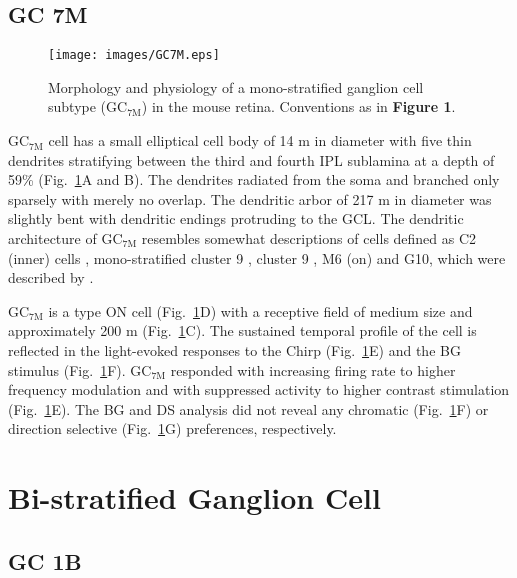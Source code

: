 \subsection{GC 7M}     

\begin{figure}[t]
\begin{center}
\texttt{[image: images/GC7M.eps]}
\caption{Morphology and physiology of a mono-stratified ganglion cell subtype (GC$_\text{{7M}}$) in the mouse retina. Conventions as in \textbf{Figure 1}.}
\label{figure7}
\end{center}
\end{figure}

GC$_{\text{7M}}$ cell has a small elliptical cell body of 14 \textmu m in diameter with five thin dendrites stratifying between the third and fourth IPL sublamina at a depth of 59\% (Fig.~\ref{figure7}A and B). The dendrites radiated from the soma and branched only sparsely with merely no overlap. The dendritic arbor of 217 \textmu m in diameter was slightly bent with dendritic endings protruding to the GCL. The dendritic architecture of GC$_{\text{7M}}$ resembles somewhat descriptions of cells defined as C2 (inner) cells \citep{sun02}, mono-stratified cluster 9 \citep{badea04}, cluster 9 \citep{kong05}, M6 (on) \citep{coombs06} and G10, which were described by \citet{voelgyi09}. 

GC$_{\text{7M}}$ is a type ON cell (Fig.~\ref{figure7}D) with a receptive field of medium size and approximately 200 \textmu m (Fig.~\ref{figure7}C). The sustained temporal profile of the cell is reflected in the light-evoked responses to the Chirp (Fig.~\ref{figure7}E) and the BG stimulus (Fig.~\ref{figure7}F). GC$_{\text{7M}}$ responded with increasing firing rate to higher frequency modulation and with suppressed activity to higher contrast stimulation (Fig.~\ref{figure7}E). The BG and DS analysis did not reveal any chromatic (Fig.~\ref{figure7}F) or direction selective (Fig.~\ref{figure7}G) preferences, respectively.

\section{Bi-stratified Ganglion Cell}
\subsection{GC 1B} 

